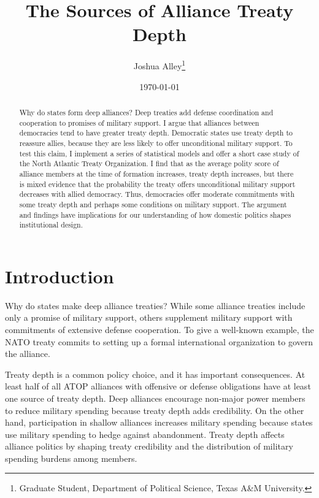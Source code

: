 \documentclass[12pt]{article}
\title{\textbf{The Sources of Alliance Treaty Depth}}
\author{Joshua Alley\footnote{Graduate Student,
Department of Political Science, Texas A\&M University.}}
\date{\today}
\begin{document}
\maketitle 

\doublespace 

\begin{abstract}
Why do states form deep alliances? 
Deep treaties add defense coordination and cooperation to promises of military support.
I argue that alliances between democracies tend to have greater treaty depth. 
Democratic states use treaty depth to reassure allies, because they are less likely to offer unconditional military support.
To test this claim, I implement a series of statistical models and offer a short case study of the North Atlantic Treaty Organization.
I find that as the average polity score of alliance members at the time of formation increases, treaty depth increases, but there is mixed evidence that the probability the treaty offers unconditional military support decreases with allied democracy. 
Thus, democracies offer moderate commitments with some treaty depth and perhaps some conditions on military support. 
The argument and findings have implications for our understanding of how domestic politics shapes institutional design. 
\end{abstract}


\newpage 


\section{Introduction}


Why do states make deep alliance treaties? 
While some alliance treaties include only a promise of military support, others supplement military support with commitments of extensive defense cooperation. 
To give a well-known example, the NATO treaty commits to setting up a formal international organization to govern the alliance. 


Treaty depth is a common policy choice, and it has important consequences. 
At least half of all ATOP alliances with offensive or defense obligations have at least one source of treaty depth.
Deep alliances encourage non-major power members to reduce military spending because treaty depth adds credibility.  
On the other hand, participation in shallow alliances increases military spending because states use military spending to hedge against abandonment.
Treaty depth affects alliance politics by shaping treaty credibility and the distribution of military spending burdens among members. 
\end{document}
